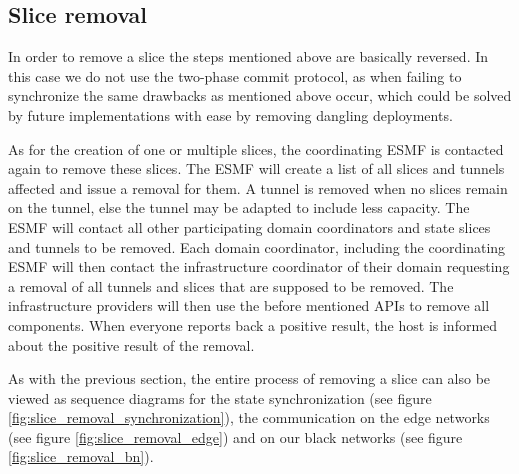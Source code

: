 \subsection{Slice removal}
In order to remove a slice the steps mentioned above are basically reversed. In this case we do not use the two-phase commit protocol, as when failing to synchronize the same drawbacks as mentioned above occur, which could be solved by future implementations with ease by removing dangling deployments.

As for the creation of one or multiple slices, the coordinating ESMF is contacted again to remove these slices. The ESMF will create a list of all slices and tunnels affected and issue a removal for them. A tunnel is removed when no slices remain on the tunnel, else the tunnel may be adapted to include less capacity. The ESMF will contact all other participating domain coordinators and state slices and tunnels to be removed. Each domain coordinator, including the coordinating ESMF will then contact the infrastructure coordinator of their domain requesting a removal of all tunnels and slices that are supposed to be removed. The infrastructure providers will then use the before mentioned APIs to remove all components. When everyone reports back a positive result, the host is informed about the positive result of the removal.

As with the previous section, the entire process of removing a slice can also be viewed as sequence diagrams for the state synchronization (see figure \ref{fig:slice_removal_synchronization}), the communication on the edge networks (see figure \ref{fig:slice_removal_edge}) and on our black networks (see figure \ref{fig:slice_removal_bn}).


